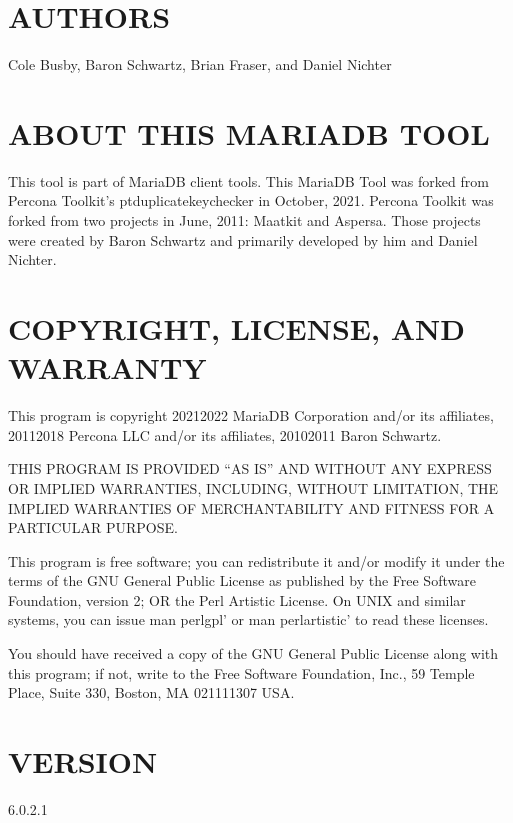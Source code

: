 \documentclass[letterpaper,10pt,english]{sphinxmanual}
\begin{document}
\section{AUTHORS}
\label{\detokenize{mariadb-index-checker:authors}}
Cole Busby, Baron Schwartz, Brian Fraser, and Daniel Nichter


\section{ABOUT THIS MARIADB TOOL}
\label{\detokenize{mariadb-index-checker:about-this-mariadb-tool}}
This tool is part of MariaDB client tools. This MariaDB Tool was forked from
Percona Toolkit’s pt\sphinxhyphen{}duplicate\sphinxhyphen{}key\sphinxhyphen{}checker in October, 2021. Percona Toolkit
was forked from two projects in June, 2011: Maatkit and Aspersa.
Those projects were created by Baron Schwartz and primarily developed by him
and Daniel Nichter.


\section{COPYRIGHT, LICENSE, AND WARRANTY}
\label{\detokenize{mariadb-index-checker:copyright-license-and-warranty}}
This program is copyright 2021\sphinxhyphen{}2022 MariaDB Corporation and/or its affiliates,
2011\sphinxhyphen{}2018 Percona LLC and/or its affiliates, 2010\sphinxhyphen{}2011 Baron Schwartz.

THIS PROGRAM IS PROVIDED “AS IS” AND WITHOUT ANY EXPRESS OR IMPLIED
WARRANTIES, INCLUDING, WITHOUT LIMITATION, THE IMPLIED WARRANTIES OF
MERCHANTABILITY AND FITNESS FOR A PARTICULAR PURPOSE.

This program is free software; you can redistribute it and/or modify it under
the terms of the GNU General Public License as published by the Free Software
Foundation, version 2; OR the Perl Artistic License.  On UNIX and similar
systems, you can issue \textasciigrave{}man perlgpl’ or \textasciigrave{}man perlartistic’ to read these
licenses.

You should have received a copy of the GNU General Public License along with
this program; if not, write to the Free Software Foundation, Inc., 59 Temple
Place, Suite 330, Boston, MA  02111\sphinxhyphen{}1307  USA.


\section{VERSION}
\label{\detokenize{mariadb-index-checker:version}}
 6.0.2.1
\end{document}
